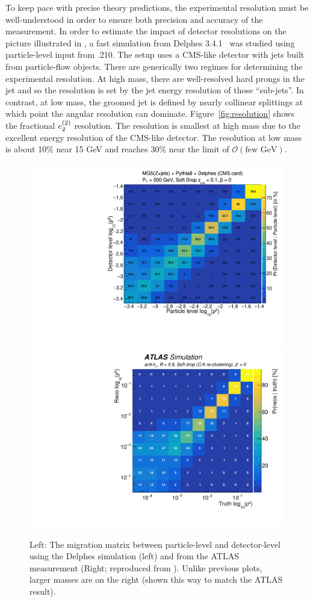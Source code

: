 To keep pace with precise theory predictions, the experimental resolution must be well-understood in order to ensure both precision and accuracy of the measurement.
%
In order to estimate the impact of detector resolutions on the picture illustrated in , a fast simulation from Delphes
3.4.1~\cite{deFavereau:2013fsa} was studied using particle-level input from \pythia.210.
%
The setup uses a CMS-like detector with jets built from particle-flow objects.
%
There are generically two regimes for determining the experimental resolution.
%
At high mass, there are well-resolved hard prongs in the jet and so the resolution is set by the jet energy resolution of those ``sub-jets''.
%
In contrast, at low mass, the groomed jet is defined by nearly collinear splittings at which point the angular resolution can dominate.
%
Figure~\ref{fig:resolution} shows the fractional $e_{2}^{(2)}$ resolution.
%
The resolution is smallest at high mass due to the excellent energy resolution of the CMS-like detector.
%
The resolution at low mass is about 10\% near 15 GeV and reaches 30\% near the limit of $\mathcal{O}(\text{few GeV})$.

\begin{figure}[t]
\begin{center}
\includegraphics[width = 0.49\columnwidth]{figures/experimentaldemo/Rho_2D.pdf}\includegraphics[width = 0.49\columnwidth]{figures/figaux_03a.pdf}
\end{center}
\caption{Left: The migration matrix between particle-level and detector-level using the Delphes simulation (left) and from the ATLAS measurement (Right; reproduced from ).  Unlike previous plots, larger masses are on the right (shown this way to match the ATLAS result). }
\label{fig:expres}
\end{figure}

